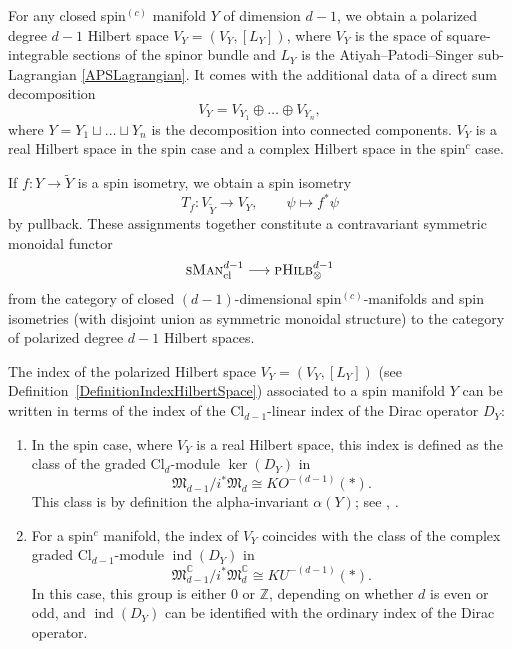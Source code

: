 \documentclass[pdftex]{sigma}
\numberwithin{equation}{section}
\newcommand{\pHilb}{\textsc{pHilb}}
\newcommand{\Z}{\mathbb{Z}}
\newcommand{\C}{\mathbb{C}}
\newcommand{\ind}{\operatorname{ind}}
\newcommand{\Cl}{\mathrm{Cl}}
\begin{document}
\begin{Construction} \label{ConstructionVX}
For any closed spin$^{(c)}$ manifold $Y$ of dimension $d-1$, we obtain a polarized degree $d-1$ Hilbert space $V_Y = (V_Y, [L_Y])$, where $V_Y$ is the space of square-integrable sections of the spinor bundle and $L_Y$ is the Atiyah--Patodi--Singer sub-Lagrangian \eqref{APSLagrangian}.
It comes with the additional data of a direct sum decomposition
\begin{equation}
\label{ObservationMonoidality}
 V_Y = V_{Y_1} \oplus \dots \oplus V_{Y_n},
\end{equation}
where $Y = Y_1 \sqcup \dots \sqcup Y_n$ is the decomposition into connected components.
$V_Y$ is a real Hilbert space in the spin case and a complex Hilbert space in the spin$^c$ case.

If $f\colon Y \to \tilde{Y}$ is a spin isometry, we obtain a spin isometry
\begin{equation}
\label{InducedIsomorphism}
 T_f\colon V_{\tilde{Y}} \to V_Y, \qquad \psi \longmapsto f^*\psi
\end{equation}
by pullback.
These assignments together constitute a contravariant symmetric monoidal functor
\begin{gather}
 \textsc{sMan}^{d-1}_{\mathrm{cl}} \longrightarrow \pHilb_\otimes^{d-1}\label{FunctorSManPHilb}
\end{gather}
from the category of closed $(d-1)$-dimensional spin$^{(c)}$-manifolds and spin isometries (with disjoint union as symmetric monoidal structure) to the category of polarized degree $d-1$ Hilbert spaces.
\end{Construction}


\begin{Remark}
The index of the polarized Hilbert space $V_Y = (V_Y, [L_Y])$ (see Definition~\ref{DefinitionIndexHilbertSpace}) associated to a spin manifold $Y$ can be written in terms of the index of the $\Cl_{d-1}$-linear index of the Dirac operator $D_Y$:
\begin{enumerate}\itemsep=0pt
\item[(a)]
In the spin case, where $V_Y$ is a real Hilbert space, this index is defined as the class of the graded $\Cl_d$-module $\ker(D_Y)$ in \[\mathfrak{M}_{d-1}/i^* \mathfrak{M}_{d} \cong KO^{-(d-1)}(*).\]
This class is by definition the alpha-invariant $\alpha(Y)$; see \cite[Section~4.2]{HitchinHarmonicSpinors}, \cite[Section~III.16]{LawsonMichelsohn}.
\item[(b)]
For a spin$^c$ manifold, the index of $V_Y$ coincides with the class of the complex graded $\Cl_{d-1}$-module $\ind(D_Y)$ in \[\mathfrak{M}_{d-1}^\C/i^* \mathfrak{M}_{d}^\C \cong KU^{-(d-1)}(*).\]
In this case, this group is either $0$ or $\Z$, depending on whether $d$ is even or odd, and $\ind(D_Y)$ can be identified with the ordinary index of the Dirac operator.
\end{enumerate}
\end{Remark}
\end{document}
